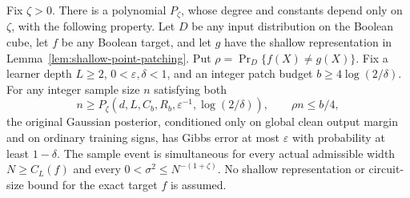 \begin{theorem}
\label{thm:unrestricted-target-corruption}
Fix $\zeta>0$. There is a polynomial $P_\zeta$, whose degree and constants
depend only on $\zeta$, with the following property. Let $D$ be any input
distribution on the Boolean cube, let $f$ be any Boolean target, and let
$g$ have the shallow representation in Lemma~\ref{lem:shallow-point-patching}.
Put $\rho=\Pr_D\{f(X)\ne g(X)\}$.
Fix a learner depth $L\ge2$, $0<\varepsilon,\delta<1$, and an integer
patch budget $b\ge4\log(2/\delta)$.
For any integer sample size $n$ satisfying both
\[
 n\ge P_\zeta(d,L,C_b,R_b,\varepsilon^{-1},\log(2/\delta)),
 \qquad \rho n\le b/4,
\]
the original Gaussian posterior, conditioned only on global clean output
margin and on ordinary training signs, has Gibbs error at most
$\varepsilon$ with probability at least $1-\delta$.
The sample event is simultaneous for every actual admissible width
$N\ge C_L(f)$ and every $0<\sigma^2\le N^{-(1+\zeta)}$.
No shallow representation or circuit-size bound for the exact target $f$
is assumed.
\end{theorem}

